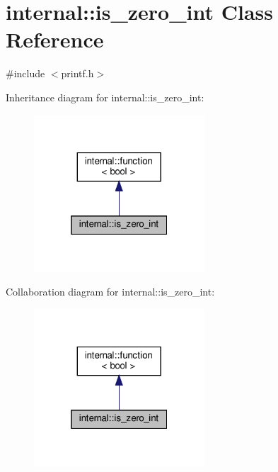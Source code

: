 \hypertarget{classinternal_1_1is__zero__int}{}\section{internal\+:\+:is\+\_\+zero\+\_\+int Class Reference}
\label{classinternal_1_1is__zero__int}


{\ttfamily \#include $<$printf.\+h$>$}



Inheritance diagram for internal\+:\+:is\+\_\+zero\+\_\+int\+:
\nopagebreak
\begin{figure}[H]
\begin{center}
\leavevmode
\includegraphics[width=181pt]{classinternal_1_1is__zero__int__inherit__graph}
\end{center}
\end{figure}


Collaboration diagram for internal\+:\+:is\+\_\+zero\+\_\+int\+:
\nopagebreak
\begin{figure}[H]
\begin{center}
\leavevmode
\includegraphics[width=181pt]{classinternal_1_1is__zero__int__coll__graph}
\end{center}
\end{figure}
